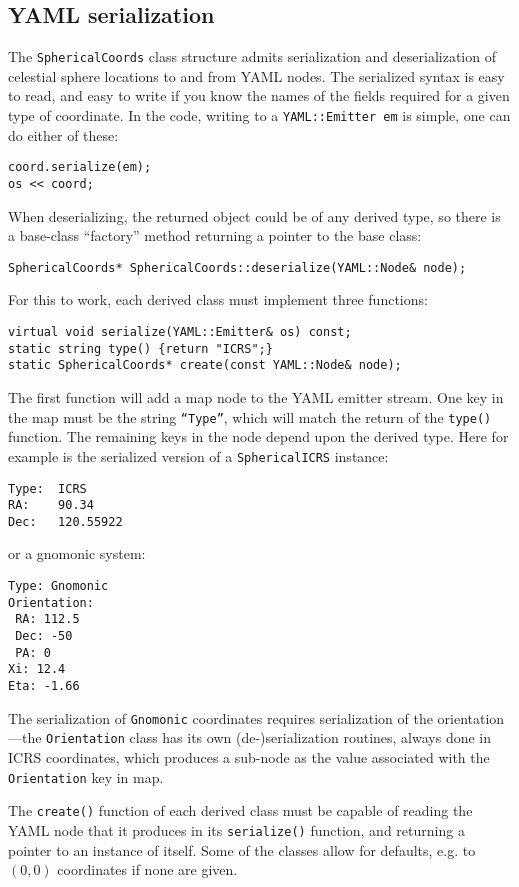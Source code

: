 \documentclass[11pt,preprint,flushrt]{aastex}
\begin{document}
\subsection{YAML serialization}
The \texttt{SphericalCoords} class structure admits serialization and deserialization of celestial sphere locations to and from YAML nodes.  The serialized syntax is easy to read, and easy to write if you know the names of the fields required for a given type of coordinate.  In the code, writing to a \texttt{YAML::Emitter em} is simple, one can do either of these:
\begin{verbatim}
coord.serialize(em);
os << coord;
\end{verbatim}

When deserializing, the returned object could be of any derived type, so there is a base-class ``factory'' method returning a pointer to the base class:
\begin{verbatim}
SphericalCoords* SphericalCoords::deserialize(YAML::Node& node);
\end{verbatim}

For this to work, each derived class must implement three functions:
\begin{verbatim}
virtual void serialize(YAML::Emitter& os) const;
static string type() {return "ICRS";}
static SphericalCoords* create(const YAML::Node& node);
\end{verbatim}
The first function will add a map node to the YAML emitter stream.  One key in the map must be the string \texttt{``Type''}, which will match the return of the \texttt{type()} function.  The remaining keys in the node depend upon the derived type.  Here for example is the serialized version of a \texttt{SphericalICRS} instance:
\begin{verbatim}
Type:  ICRS
RA:    90.34
Dec:   120.55922
\end{verbatim}
or a gnomonic system:
\begin{verbatim}
Type: Gnomonic
Orientation:
 RA: 112.5
 Dec: -50
 PA: 0
Xi: 12.4
Eta: -1.66
\end{verbatim}
The serialization of \texttt{Gnomonic} coordinates requires serialization of the orientation---the \texttt{Orientation} class has its own (de-)serialization routines, always done in ICRS coordinates, which produces a sub-node as the value associated with the \texttt{Orientation} key in map.

The \texttt{create()} function of each derived class must be capable of reading the YAML node that it produces in its \texttt{serialize()} function, and returning a pointer to an instance of itself.  Some of the classes allow for defaults, e.g. to $(0,0)$ coordinates if none are given.
\end{document}
